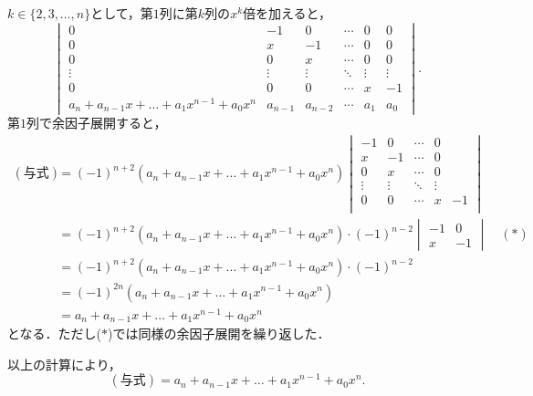 \documentclass[a4paper,10pt,fleqn]{ltjsarticle}
\begin{document}
\begin{tleftbar}
    $ k \in \{ 2,3 ,\ldots,n \}$として，第$1$列に第$k$列の$x^k$倍を加えると，
    \[
        \begin{vmatrix}
            0                                              & -1      & 0       & \cdots & 0      & 0      \\
            0                                              & x       & -1      & \cdots & 0      & 0      \\
            0                                              & 0       & x       & \cdots & 0      & 0      \\
            \vdots                                         & \vdots  & \vdots  & \ddots & \vdots & \vdots \\
            0                                              & 0       & 0       & \cdots & x      & -1     \\
            a_n + a_{n-1} x + \dots +a_1 x^{n-1} + a_0 x^n & a_{n-1} & a_{n-2} & \cdots & a_1    & a_0
        \end{vmatrix}.
    \]
    第$1$列で余因子展開すると，
    \begin{align*}
        (\text{与式}) & = (-1)^{n+2} (a_n + a_{n-1} x + \dots +a_1 x^{n-1} + a_0 x^n)
        \begin{vmatrix}
            -1     & 0      & \cdots & 0           \\
            x      & -1     & \cdots & 0           \\
            0      & x      & \cdots & 0           \\
            \vdots & \vdots & \ddots & \vdots &    \\
            0      & 0      & \cdots & x      & -1 \\
        \end{vmatrix}                                                                                                                           \\
                    & = (-1)^{n+2}(a_n + a_{n-1} x + \dots +a_1 x^{n-1} + a_0 x^n) \cdot (-1)^{n-2} \begin{vmatrix} -1 & 0 \\ x & -1 \end{vmatrix} \quad (\text{$\ast$}) \\
                    & = (-1)^{n+2} (a_n + a_{n-1} x + \dots +a_1 x^{n-1} + a_0 x^n) \cdot (-1)^{n-2}                                                                     \\
                    & = (-1)^{2n} (a_n + a_{n-1} x + \dots +a_1 x^{n-1} + a_0 x^n)                                                                                       \\
                    & = a_n + a_{n-1} x + \dots +a_1 x^{n-1} + a_0 x^n
    \end{align*}
    となる．ただし($\ast$)では同様の余因子展開を繰り返した．

    以上の計算により，
    \[
        (\text{与式}) = a_n + a_{n-1} x + \dots +a_1 x^{n-1} + a_0 x^n.
    \]
\end{tleftbar}
\end{document}

